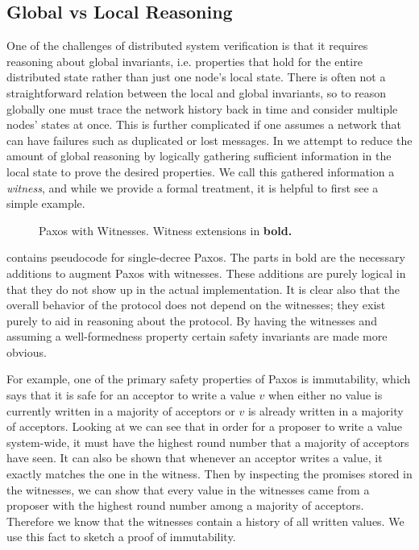 \subsection{Global vs Local Reasoning}
\label{subsec:global-local-reasoning}

One of the challenges of distributed system verification is that it requires reasoning about
global invariants, i.e. properties that hold for the entire distributed state rather than just
one node's local state.
There is often not a straightforward relation between the local and global invariants, so
to reason globally one must trace the network history back in time and consider multiple
nodes' states at once.
This is further complicated if one assumes a network that can have failures such as duplicated
or lost messages.
In \sysname{} we attempt to reduce the amount of global reasoning by logically gathering sufficient
information in the local state to prove the desired properties.
We call this gathered information a \textit{witness}, and while we provide a formal treatment, it is helpful to first see a simple example.

\begin{figure}
\begin{minipage}{\linewidth}
\noindent
\begin{multicols}{2}
  
\end{multicols}
\end{minipage}
\caption{Paxos with Witnesses. Witness extensions in \bfseries{bold}.}
\label{fig:paxos-witness}
\end{figure}

 contains pseudocode for single-decree Paxos.
The parts in bold are the necessary additions to augment Paxos with witnesses.
These additions are purely logical in that they do not show up in the actual implementation.
It is clear also that the overall behavior of the protocol does not depend on the witnesses;
they exist purely to aid in reasoning about the protocol.
By having the witnesses and assuming a well-formedness property certain safety invariants are
made more obvious.

For example, one of the primary safety properties of Paxos is immutability, which says that it
is safe for an acceptor to write a value $v$ when either no value is currently written in a
majority of acceptors or $v$ is already written in a majority of acceptors.
Looking at  we can see that in order for a proposer to write a value system-wide,
it must have the highest round number that a majority of acceptors have seen.
It can also be shown that whenever an acceptor writes a value, it exactly matches the one in the witness.
Then by inspecting the promises stored in the witnesses, we can show that every value in the witnesses
came from a proposer with the highest round number among a majority of acceptors.
Therefore we know that the witnesses contain a history of all written values.
We use this fact to sketch a proof of immutability.

